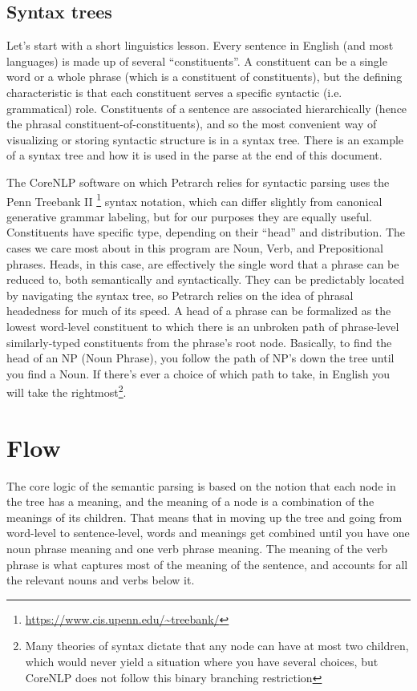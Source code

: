 \documentclass[11pt]{article}
\begin{document}
\subsection{Syntax trees}
Let's start with a short linguistics lesson. Every sentence in English (and most languages) is made up of several ``constituents''. A constituent can be a single 
word or a whole phrase (which is a constituent of constituents), but the defining 
characteristic is that each constituent serves a specific syntactic (i.e. grammatical) role. 
Constituents of a sentence are associated hierarchically (hence the phrasal constituent-of-constituents),
 and so the most convenient way of visualizing or storing syntactic structure 
is in a syntax tree. There is an example of a syntax tree and how it is used in 
the parse at the end of this document. 

The CoreNLP software on which Petrarch relies for syntactic parsing
uses the Penn Treebank II \footnote{\url{https://www.cis.upenn.edu/~treebank/}} syntax notation, which can differ slightly from canonical 
generative grammar labeling, but for our purposes they are equally useful. 
Constituents have specific type, depending on their ``head'' and distribution. The cases we care most about in this program are Noun, Verb, and 
Prepositional phrases. Heads, in this case, are effectively the single word that a phrase 
can be reduced to, both semantically and syntactically. They can be predictably located 
by navigating the syntax tree, so Petrarch relies on the idea of phrasal headedness 
for much of its speed. A head of a phrase can be formalized as the lowest word-level constituent
to which there is an unbroken path of phrase-level similarly-typed constituents from the phrase's root 
node. Basically, to find the head of an NP (Noun Phrase), you follow the path of NP's down the 
tree until you find a Noun. If there's ever a choice of which path to take, in English you will
take the rightmost\footnote{Many theories of syntax dictate that any node can have at most two children, which would 
never yield a situation where you have several choices, but CoreNLP does not follow this binary branching restriction}.

 \section{Flow}
The core logic of the semantic parsing is based on the notion that each node in the 
tree has a meaning, and the meaning of a node is a combination of the meanings 
of its children. That means that in moving up the tree and going from word-level to 
sentence-level, words and meanings get combined until you have one noun phrase 
meaning and one verb phrase meaning. The meaning of the verb phrase is what captures 
most of the meaning of the sentence, and accounts for all the relevant nouns and 
verbs below it. 
\end{document}

